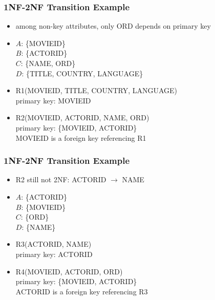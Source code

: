 \documentclass[dvipsnames]{beamer}
\begin{document}
\begin{frame}
  \frametitle{1NF-2NF Transition Example}

  \begin{itemize}
    \item among non-key attributes, only ORD depends on primary key
    \item $A$: \{MOVIEID\}\\
      $B$: \{ACTORID\}\\
      $C$: \{NAME, ORD\}\\
      $D$: \{TITLE, COUNTRY, LANGUAGE\}

    \pause
    \medskip
    \item R1(MOVIEID, TITLE, COUNTRY, LANGUAGE)\\
      primary key: MOVIEID

    \item R2(MOVIEID, ACTORID, NAME, ORD)\\
      primary key: \{MOVIEID, ACTORID\}\\
      MOVIEID is a foreign key referencing R1
  \end{itemize}
\end{frame}

\begin{frame}
  \frametitle{1NF-2NF Transition Example}

  \begin{itemize}
    \item R2 still not 2NF: ACTORID $\rightarrow$ NAME
    \item $A$: \{ACTORID\}\\
      $B$: \{MOVIEID\}\\
      $C$: \{ORD\}\\
      $D$: \{NAME\}

    \pause
    \medskip
    \item R3(ACTORID, NAME)\\
      primary key: ACTORID

    \item R4(MOVIEID, ACTORID, ORD)\\
      primary key: \{MOVIEID, ACTORID\}\\
      ACTORID is a foreign key referencing R3
  \end{itemize}
\end{frame}
\end{document}
